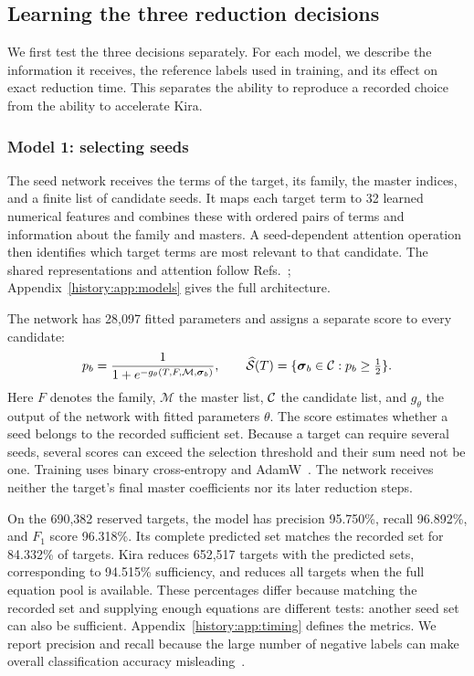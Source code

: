 \subsection{Learning the three reduction decisions}
\label{history:sec:local-models}
We first test the three decisions separately. For each model, we describe the information it receives, the reference labels used in training, and its effect on exact reduction time. This separates the ability to reproduce a recorded choice from the ability to accelerate Kira.

\subsubsection{Model 1: selecting seeds}
\label{history:sec:seeds}
The seed network receives the terms of the target, its family, the master indices, and a finite list of candidate seeds. It maps each target term to 32 learned numerical features and combines these with ordered pairs of terms and information about the family and masters. A seed-dependent attention operation then identifies which target terms are most relevant to that candidate. The shared representations and attention follow Refs.~\cite{DeepSets,AttentionIsAllYouNeed}; Appendix~\ref{history:app:models} gives the full architecture.

The network has 28,097 fitted parameters and assigns a separate score to every candidate:
\begin{equation}
 p_b=\frac{1}{1+e^{-g_\theta(T,F,\mathcal M,\boldsymbol\sigma_b)}},
 \qquad
 \widehat{\mathcal S}(T)=\{\boldsymbol\sigma_b\in\mathcal C:p_b\geq\tfrac12\}.
 \label{history:eq:seed}
\end{equation}
Here $F$ denotes the family, $\mathcal M$ the master list, $\mathcal C$ the candidate list, and $g_\theta$ the output of the network with fitted parameters $\theta$. The score estimates whether a seed belongs to the recorded sufficient set. Because a target can require several seeds, several scores can exceed the selection threshold and their sum need not be one. Training uses binary cross-entropy and AdamW~\cite{AdamW}. The network receives neither the target's final master coefficients nor its later reduction steps.

On the 690,382 reserved targets, the model has precision 95.750\%, recall 96.892\%, and $F_1$ score 96.318\%. Its complete predicted set matches the recorded set for 84.332\% of targets. Kira reduces 652,517 targets with the predicted sets, corresponding to 94.515\% sufficiency, and reduces all targets when the full equation pool is available. These percentages differ because matching the recorded set and supplying enough equations are different tests: another seed set can also be sufficient. Appendix~\ref{history:app:timing} defines the metrics. We report precision and recall because the large number of negative labels can make overall classification accuracy misleading~\cite{SaitoRehmsmeier2015}.

